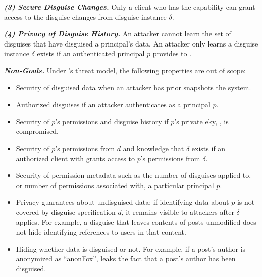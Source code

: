 \vspace{6pt}\noindent\textbf{\emph{(3) Secure Disguise Changes.}}
%
Only a client who has the capability  can grant \sys access to the disguise changes from 
disguise instance $\delta$.
%

\vspace{6pt}\noindent\textbf{\emph{(4) Privacy of Disguise History.}}
%
An attacker cannot learn the set of disguises that have disguised a principal's data.
%
An attacker only learns a disguise instance $\delta$ exists if an authenticated principal $p$ provides
 to \sys.

\vspace{6pt}\noindent\textbf{\emph{Non-Goals.}}
%
Under \sys's threat model, the following properties are out of scope:
%
\begin{itemize}
    \item Security of disguised data when an attacker has prior snapshots the system.
    \item Authorized disguises if an attacker authenticates as a principal $p$. 
    \item Security of $p$'s permissions and disguise history if $p$'s private eky, , is compromised.
    \item Security of $p$'s permissions from $d$ and knowledge that $\delta$ exists if an
	authorized client with  grants \sys access to $p$'s permissions from $\delta$. 
    \item Security of permission metadata such as the number of disguises applied to, or number of
	permissions associated with, a particular principal $p$.
    \item Privacy guarantees about undisguised data: if identifying data about $p$ is not covered by
        disguise specification $d$, it remains visible to attackers after $\delta$ applies.
        For example, a disguise that leaves contents of posts unmodified does not hide identifying references
	to users in that content.
    \item Hiding whether data is disguised or not. For example, if a post's author is anonymized as ``anonFox'',
        \sys leaks the fact that a post's author has been disguised.
\end{itemize}


